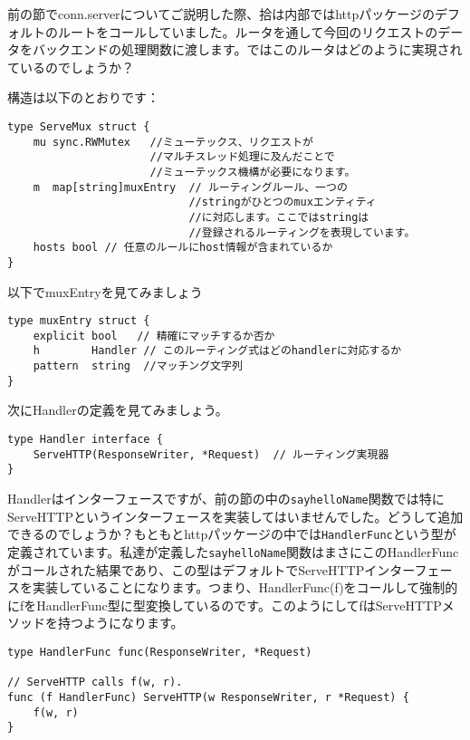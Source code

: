 前の節でconn.serverについてご説明した際、拾は内部ではhttpパッケージのデフォルトのルートをコールしていました。ルータを通して今回のリクエストのデータをバックエンドの処理関数に渡します。ではこのルータはどのように実現されているのでしょうか？

構造は以下のとおりです：


\begin{lstlisting}[numbers=none]
type ServeMux struct {
    mu sync.RWMutex   //ミューテックス、リクエストが
                      //マルチスレッド処理に及んだことで
                      //ミューテックス機構が必要になります。
    m  map[string]muxEntry  // ルーティングルール、一つの
                            //stringがひとつのmuxエンティティ
                            //に対応します。ここではstringは
                            //登録されるルーティングを表現しています。
    hosts bool // 任意のルールにhost情報が含まれているか
}
\end{lstlisting}

以下でmuxEntryを見てみましょう

\begin{lstlisting}[numbers=none]
type muxEntry struct {
    explicit bool   // 精確にマッチするか否か
    h        Handler // このルーティング式はどのhandlerに対応するか
    pattern  string  //マッチング文字列
}
\end{lstlisting}

次にHandlerの定義を見てみましょう。

\begin{lstlisting}[numbers=none]
type Handler interface {
    ServeHTTP(ResponseWriter, *Request)  // ルーティング実現器
}
\end{lstlisting}

Handlerはインターフェースですが、前の節の中の\texttt{sayhelloName}関数では特にServeHTTPというインターフェースを実装してはいませんでした。どうして追加できるのでしょうか？もともとhttpパッケージの中では\texttt{HandlerFunc}という型が定義されています。私達が定義した\texttt{sayhelloName}関数はまさにこのHandlerFuncがコールされた結果であり、この型はデフォルトでServeHTTPインターフェースを実装していることになります。つまり、HandlerFunc(f)をコールして強制的にfをHandlerFunc型に型変換しているのです。このようにしてfはServeHTTPメソッドを持つようになります。

\begin{lstlisting}[numbers=none]
type HandlerFunc func(ResponseWriter, *Request)

// ServeHTTP calls f(w, r).
func (f HandlerFunc) ServeHTTP(w ResponseWriter, r *Request) {
    f(w, r)
}
\end{lstlisting}

